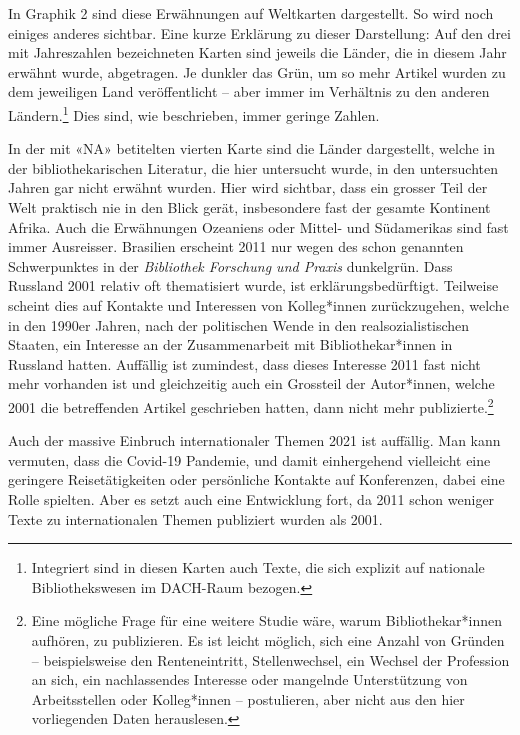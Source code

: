 \documentclass[a4paper,
fontsize=11pt,
oneside,
numbers=noperiodatend,
parskip=half-,
bibliography=totoc,
final
]{scrartcl}
\begin{document}
In Graphik 2 sind diese Erwähnungen auf Weltkarten dargestellt. So wird
noch einiges anderes sichtbar. Eine kurze Erklärung zu dieser
Darstellung: Auf den drei mit Jahreszahlen bezeichneten Karten sind
jeweils die Länder, die in diesem Jahr erwähnt wurde, abgetragen. Je
dunkler das Grün, um so mehr Artikel wurden zu dem jeweiligen Land
veröffentlicht -- aber immer im Verhältnis zu den anderen
Ländern.\footnote{Integriert sind in diesen Karten auch Texte, die sich
  explizit auf nationale Bibliothekswesen im DACH-Raum bezogen.} Dies
sind, wie beschrieben, immer geringe Zahlen.

In der mit «NA» betitelten vierten Karte sind die Länder dargestellt,
welche in der bibliothekarischen Literatur, die hier untersucht wurde,
in den untersuchten Jahren gar nicht erwähnt wurden. Hier wird sichtbar,
dass ein grosser Teil der Welt praktisch nie in den Blick gerät,
insbesondere fast der gesamte Kontinent Afrika. Auch die Erwähnungen
Ozeaniens oder Mittel- und Südamerikas sind fast immer Ausreisser.
Brasilien erscheint 2011 nur wegen des schon genannten Schwerpunktes in
der \emph{Bibliothek Forschung und Praxis} dunkelgrün. Dass Russland
2001 relativ oft thematisiert wurde, ist erklärungsbedürftigt. Teilweise
scheint dies auf Kontakte und Interessen von Kolleg*innen zurückzugehen,
welche in den 1990er Jahren, nach der politischen Wende in den
realsozialistischen Staaten, ein Interesse an der Zusammenarbeit mit
Bibliothekar*innen in Russland hatten. Auffällig ist zumindest, dass
dieses Interesse 2011 fast nicht mehr vorhanden ist und gleichzeitig
auch ein Grossteil der Autor*innen, welche 2001 die betreffenden Artikel
geschrieben hatten, dann nicht mehr publizierte.\footnote{Eine mögliche
  Frage für eine weitere Studie wäre, warum Bibliothekar*innen aufhören,
  zu publizieren. Es ist leicht möglich, sich eine Anzahl von Gründen --
  beispielsweise den Renteneintritt, Stellenwechsel, ein Wechsel der
  Profession an sich, ein nachlassendes Interesse oder mangelnde
  Unterstützung von Arbeitsstellen oder Kolleg*innen -- postulieren,
  aber nicht aus den hier vorliegenden Daten herauslesen.}

Auch der massive Einbruch internationaler Themen 2021 ist auffällig. Man
kann vermuten, dass die Covid-19 Pandemie, und damit einhergehend
vielleicht eine geringere Reisetätigkeiten oder persönliche Kontakte auf
Konferenzen, dabei eine Rolle spielten. Aber es setzt auch eine
Entwicklung fort, da 2011 schon weniger Texte zu internationalen Themen
publiziert wurden als 2001.
\end{document}
